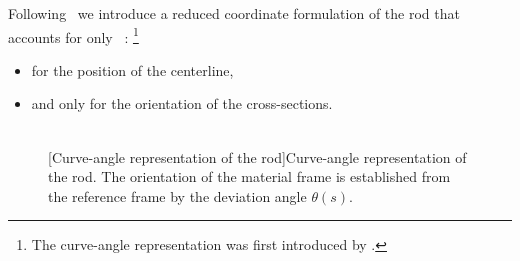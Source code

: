 Following~ we introduce a reduced coordinate formulation of the rod that accounts for only ~: \footnote{The curve-angle representation was first introduced by \cite{Langer1996}.}
\begin{itemize}
\item {} for the position of the centerline,
\item and only  for the orientation of the cross-sections.
\end{itemize}
\begin{figure}[t]
     		\centering
		\hspace{2.5cm}
		 \\
		\vspace{10pt}
		[Curve-angle representation of the rod]{Curve-angle representation of the rod. The orientation of the material frame is established from the reference frame by the deviation angle $\theta(s)$.}
		\label{fig:curve_angle}    
\end{figure}

